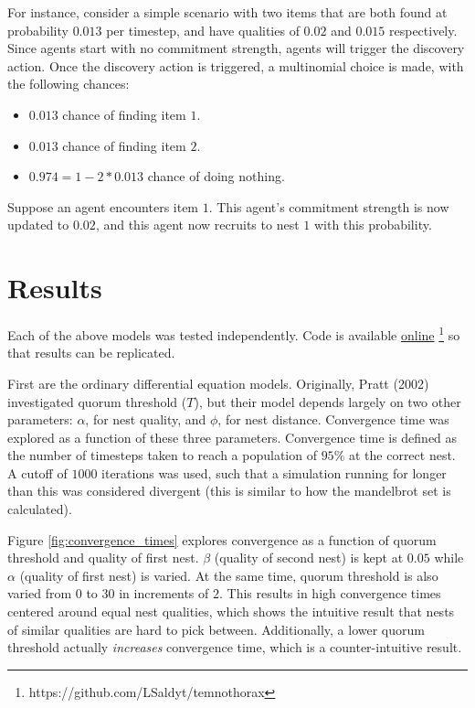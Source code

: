 \documentclass[letterpaper]{article}
\begin{document}
For instance, consider a simple scenario with two items that are both found at probability $0.013$ per timestep, and have qualities of $0.02$ and $0.015$ respectively.
Since agents start with no commitment strength, agents will trigger the discovery action.
Once the discovery action is triggered, a multinomial choice is made, with the following chances:
\begin{itemize}
    \item $0.013$ chance of finding item $1$.
    \item $0.013$ chance of finding item $2$.
    \item $0.974 = 1 - 2 * 0.013$ chance of doing nothing.
\end{itemize}

Suppose an agent encounters item $1$. This agent's commitment strength is now updated to $0.02$, and this agent now recruits to nest $1$ with this probability.

\section{Results}

Each of the above models was tested independently. Code is available \href{https://github.com/LSaldyt/temnothorax}{online} \footnote{https://github.com/LSaldyt/temnothorax} so that results can be replicated. 

First are the ordinary differential equation models.
Originally, Pratt (2002) investigated quorum threshold ($T$), but their model depends largely on two other parameters: $\alpha$, for nest quality, and $\phi$, for nest distance.
Convergence time was explored as a function of these three parameters. 
Convergence time is defined as the number of timesteps taken to reach a population of $95\%$ at the correct nest.
A cutoff of $1000$ iterations was used, such that a simulation running for longer than this was considered divergent (this is similar to how the mandelbrot set is calculated).

Figure \ref{fig:convergence_times} explores convergence as a function of quorum threshold and quality of first nest. 
$\beta$ (quality of second nest) is kept at $0.05$ while $\alpha$ (quality of first nest) is varied.
At the same time, quorum threshold is also varied from $0$ to $30$ in increments of $2$.
This results in high convergence times centered around equal nest qualities, which shows the intuitive result that nests of similar qualities are hard to pick between.
Additionally, a lower quorum threshold actually \emph{increases} convergence time, which is a counter-intuitive result.
\end{document}
